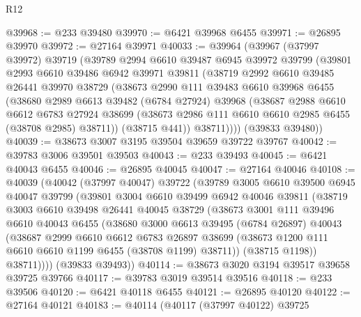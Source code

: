 \begin{lexlean}{R12}
\begin{coremodule}
@39968 := @233 @39480
@39970 := @6421 @39968 @6455
@39971 := @26895 @39970
@39972 := @27164 @39971
@40033 := @39964
    (@39967
      (@37997 @39972)
      @39719
      (@39789
        @2994
        @6610
        @39487
        @6945
        @39972
        @39799
        (@39801
          @2993
          @6610
          @39486
          @6942
          @39971
          @39811
          (@38719
            @2992
            @6610
            @39485
            @26441
            @39970
            @38729
            (@38673
              @2990
              @111
              @39483
              @6610
              @39968
              @6455
              (@38680
                @2989
                @6613
                @39482
                (@6784 @27924)
                @39968
                (@38687
                  @2988
                  @6610
                  @6612
                  @6783
                  @27924
                  @38699
                  (@38673 @2986 @111 @6610 @6610 @2985 @6455 (@38708 @2985) @38711))
                (@38715 @441))
              @38711))))
      (@39833 @39480))
@40039 := @38673 @3007 @3195 @39504 @39659 @39722 @39767
@40042 := @39783 @3006 @39501 @39503
@40043 := @233 @39493
@40045 := @6421 @40043 @6455
@40046 := @26895 @40045
@40047 := @27164 @40046
@40108 := @40039
    (@40042
      (@37997 @40047)
      @39722
      (@39789
        @3005
        @6610
        @39500
        @6945
        @40047
        @39799
        (@39801
          @3004
          @6610
          @39499
          @6942
          @40046
          @39811
          (@38719
            @3003
            @6610
            @39498
            @26441
            @40045
            @38729
            (@38673
              @3001
              @111
              @39496
              @6610
              @40043
              @6455
              (@38680
                @3000
                @6613
                @39495
                (@6784 @26897)
                @40043
                (@38687
                  @2999
                  @6610
                  @6612
                  @6783
                  @26897
                  @38699
                  (@38673 @1200 @111 @6610 @6610 @1199 @6455 (@38708 @1199) @38711))
                (@38715 @1198))
              @38711))))
      (@39833 @39493))
@40114 := @38673 @3020 @3194 @39517 @39658 @39725 @39766
@40117 := @39783 @3019 @39514 @39516
@40118 := @233 @39506
@40120 := @6421 @40118 @6455
@40121 := @26895 @40120
@40122 := @27164 @40121
@40183 := @40114
    (@40117
      (@37997 @40122)
      @39725

\end{coremodule}
\end{lexlean}
